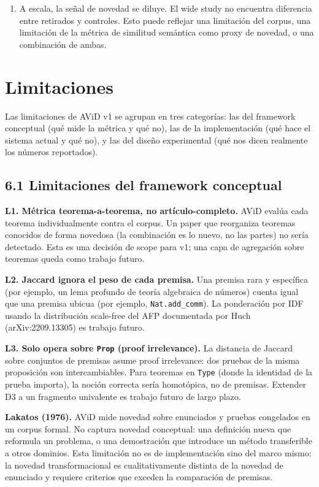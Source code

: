 \documentclass[12pt,a4paper]{article}
\theoremstyle{remark}
\begin{document}
\begin{enumerate}
\item A escala, la señal de novedad se diluye. El wide study no encuentra diferencia entre retirados y controles. Esto puede reflejar una limitación del corpus, una limitación de la métrica de similitud semántica como proxy de novedad, o una combinación de ambas.
\end{enumerate}


\section{Limitaciones}

Las limitaciones de AViD v1 se agrupan en tres categorías: las del framework conceptual (qué mide la métrica y qué no), las de la implementación (qué hace el sistema actual y qué no), y las del diseño experimental (qué nos dicen realmente los números reportados).


\subsection{6.1 Limitaciones del framework conceptual}

\textbf{L1. Métrica teorema-a-teorema, no artículo-completo.} AViD evalúa cada teorema individualmente contra el corpus. Un paper que reorganiza teoremas conocidos de forma novedosa (la combinación es lo nuevo, no las partes) no sería detectado. Esta es una decisión de scope para v1; una capa de agregación sobre teoremas queda como trabajo futuro.


\textbf{L2. Jaccard ignora el peso de cada premisa.} Una premisa rara y específica (por ejemplo, un lema profundo de teoría algebraica de números) cuenta igual que una premisa ubicua (por ejemplo, \texttt{Nat.add\_comm}). La ponderación por IDF usando la distribución scale-free del AFP documentada por Huch (arXiv:2209.13305) es trabajo futuro.


\textbf{L3. Solo opera sobre \texttt{Prop} (proof irrelevance).} La distancia de Jaccard sobre conjuntos de premisas asume proof irrelevance: dos pruebas de la misma proposición son intercambiables. Para teoremas en \texttt{Type} (donde la identidad de la prueba importa), la noción correcta sería homotópica, no de premisas. Extender D3 a un fragmento univalente es trabajo futuro de largo plazo.


\textbf{Lakatos (1976).} AViD mide novedad sobre enunciados y pruebas congelados en un corpus formal. No captura novedad conceptual: una definición nueva que reformula un problema, o una demostración que introduce un método transferible a otros dominios. Esta limitación no es de implementación sino del marco mismo: la novedad transformacional es cualitativamente distinta de la novedad de enunciado y requiere criterios que exceden la comparación de premisas.
\end{document}
